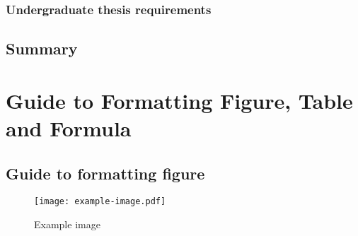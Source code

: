 \subsection{Undergraduate thesis requirements}

\lipsum[5]

\section{Summary}

\lipsum[6]


\chapter{Guide to Formatting Figure, Table and Formula}

\section{Guide to formatting figure}

\begin{figure}[ht]
  \centering
  \texttt{[image: example-image.pdf]}
  \caption{Example image}
  \label{fig:example}
\end{figure}

